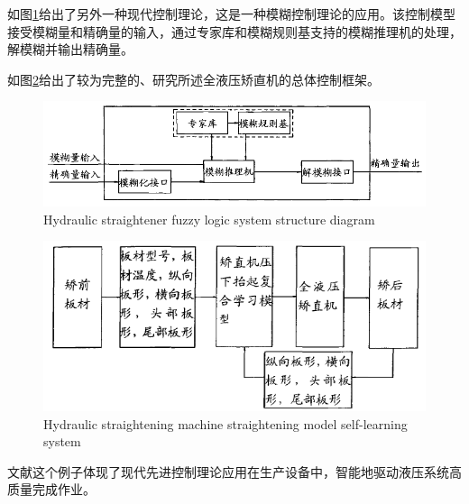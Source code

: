 如图\ref{fig:fuzzycontrol}给出了另外一种现代控制理论，这是一种模糊控制理论的应用。该控制模型接受模糊量和精确量的输入，通过专家库和模糊规则基支持的模糊推理机的处理，解模糊并输出精确量。

如图\ref{fig:selflearn}给出了较为完整的、研究所述全液压矫直机的总体控制框架。

\begin{figure}[!htp]
	\centering
	\includegraphics[width=\textwidth]{IMG/fuzzycontrol.png}
		{Hydraulic straightener fuzzy logic system structure diagram}
	\label{fig:fuzzycontrol}
\end{figure}

\begin{figure}[!htp]
	\centering
	\includegraphics[width=\textwidth]{IMG/selflearn.png}
		{Hydraulic straightening machine straightening model self-learning system}
	\label{fig:selflearn}
\end{figure}

文献\parencite{zhinengjiaozhiji}这个例子体现了现代先进控制理论应用在生产设备中，智能地驱动液压系统高质量完成作业。
